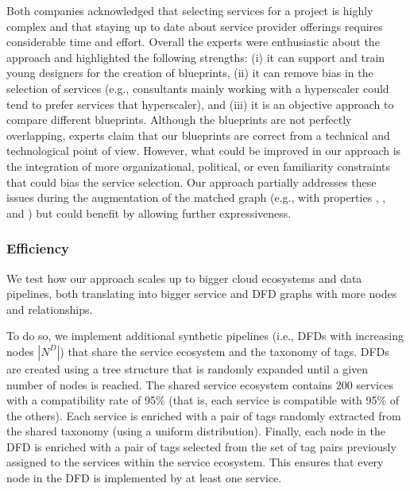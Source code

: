 Both companies acknowledged that selecting services for a project is highly complex and that staying up to date about service provider offerings requires considerable time and effort. Overall the experts were enthusiastic about the approach and highlighted the following strengths: (i) it can support and train young designers for the creation of blueprints, (ii) it can remove bias in the selection of services (e.g., consultants mainly working with a hyperscaler could tend to prefer services that hyperscaler), and (iii) it is an objective approach to compare different blueprints. Although the blueprints are not perfectly overlapping, experts claim that our blueprints are correct from a technical and technological point of view. However, what could be improved in our approach is the integration of more organizational, political, or even familiarity constraints that could bias the service selection. Our approach partially addresses these issues during the augmentation of the matched graph (e.g., with properties , , and ) but could benefit by allowing further expressiveness.

\subsubsection{Efficiency}

We test how our approach scales up to bigger cloud ecosystems and data pipelines, both translating into bigger service and DFD graphs with more nodes and relationships.

To do so, we implement additional synthetic pipelines (i.e., DFDs with increasing nodes $|N^D|$) that share the service ecosystem and the taxonomy of tags. DFDs are created using a tree structure that is randomly expanded until a given number of nodes is reached. The shared service ecosystem contains 200 services with a compatibility rate of 95\% (that is, each service is compatible with 95\% of the others). Each service is enriched with a pair of tags randomly extracted from the shared taxonomy (using a uniform distribution). Finally, each node in the DFD is enriched with a pair of tags selected from the set of tag pairs previously assigned to the services within the service ecosystem. This ensures that every node in the DFD is implemented by at least one service.

